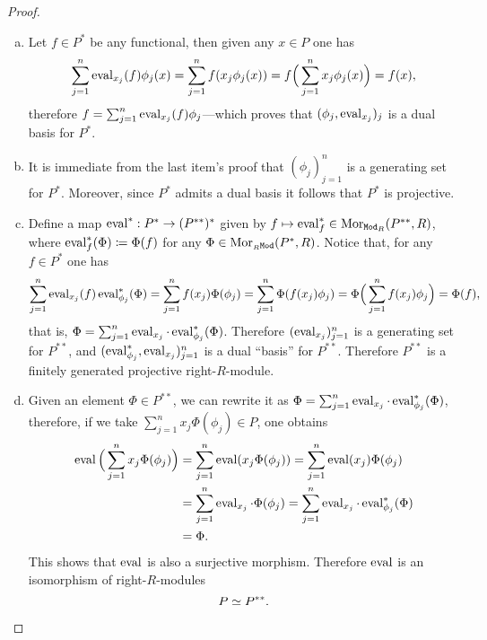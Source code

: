 \begin{proof}
    \begin{enumerate}[(a)]\setlength\itemsep{0em}
        \item Let \(f \in P^{*}\) be any functional, then given any \(x \in P\) one has
              \[
                  \sum_{j=1}^n \operatorname{eval}_{x_j}(f) \phi_j(x)
                  = \sum_{j=1}^{n} f(x_j \phi_j(x))
                  = f\Big( \sum_{j=1}^{n} x_j \phi_j(x) \Big)
                  = f(x),
              \]
              therefore \(f = \sum_{j=1}^n \operatorname{eval}_{x_j}(f) \phi_j\)---which proves that
              \((\phi_j, \operatorname{eval}_{x_j})_j\) is a dual basis for \(P^{*}\).

        \item It is immediate from the last item's proof that \((\phi_j)_{j=1}^n\) is a
              generating set for \(P^{*}\). Moreover, since \(P^{*}\) admits a dual basis it
              follows that \(P^{*}\) is projective.

        \item Define a map \(\operatorname{eval}^{*}: P^{*} \to (P^{* *})^{*}\) given by \(f \mapsto
              \operatorname{eval}_f^{*} \in \operatorname{Mor}_{{\texttt{Mod}_{R}}}(P^{* *}, R)\), where \(\operatorname{eval}_f^{*}(\Phi)
              \coloneq \Phi(f)\) for any \(\Phi \in \operatorname{Mor}_{{{}_{R}\texttt{Mod}}}(P^{*}, R)\). Notice
              that, for any \(f \in P^{*}\) one has
              \[
                  \sum_{j=1}^n \operatorname{eval}_{x_j}(f) \operatorname{eval}_{\phi_j}^{*}(\Phi)
                  = \sum_{j=1}^n f(x_j) \Phi(\phi_j)
                  = \sum_{j=1}^n \Phi(f(x_j) \phi_j)
                  = \Phi\Big( \sum_{j=1}^n f(x_j) \phi_j \Big)
                  = \Phi(f),
              \]
              that is, \(\Phi = \sum_{j=1}^n \operatorname{eval}_{x_j} \cdot \operatorname{eval}_{\phi_j}^{*}
              (\Phi)\). Therefore \((\operatorname{eval}_{x_j})_{j=1}^n\) is a generating set for
              \(P^{* *}\), and \((\operatorname{eval}_{\phi_j}^{*}, \operatorname{eval}_{x_j})_{j=1}^n\) is a dual
              ``basis'' for \(P^{* *}\). Therefore \(P^{* *}\) is a finitely generated
              projective right-\(R\)-module.

        \item Given an element \(\Phi \in P^{* *}\), we can rewrite it as
              \(\Phi = \sum_{j=1}^n \operatorname{eval}_{x_j} \cdot \operatorname{eval}_{\phi_j}^{*}(\Phi)\), therefore,
              if we take \(\sum_{j=1}^n x_j \Phi(\phi_j) \in P\), one obtains
              \begin{align*}
                  \operatorname{eval}\Big(\sum_{j=1}^n x_j \Phi(\phi_j)\Big)
                   & = \sum_{j=1}^n \operatorname{eval}(x_j \Phi(\phi_j))
                  = \sum_{j=1}^n \operatorname{eval}(x_j) \Phi(\phi_j)                    \\
                   & = \sum_{j=1}^n \operatorname{eval}_{x_j} \cdot \Phi(\phi_j)
                  = \sum_{j=1}^n \operatorname{eval}_{x_j} \cdot \operatorname{eval}_{\phi_j}^{*}(\Phi) \\
                   & = \Phi.
              \end{align*}
              This shows that \(\operatorname{eval}\) is also a surjective morphism. Therefore \(\operatorname{eval}\)
              is an isomorphism of right-\(R\)-modules
              \[
                  P \simeq P^{* *}.
              \]
    \end{enumerate}
\end{proof}

